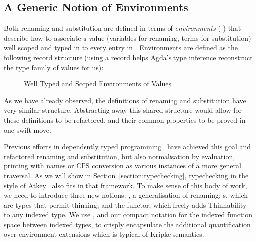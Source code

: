 \subsection{A Generic Notion of Environments}

Both renaming and substitution are defined in terms of \emph{environments}
{( )  } that describe how to associate a value 
(variables for renaming, terms for substitution) well scoped and typed in 
to every entry in . Environments are defined as the following record
structure (using a record helps Agda's type inference reconstruct the type family
 of values for us):

\begin{figure}[h]
\begin{center}
\end{center}
\caption{Well Typed and Scoped Environments of Values}\label{fig:environment}
\end{figure}

As we have already observed, the definitions of renaming and substitution have very
similar structure. Abstracting away this shared structure would allow for these
definitions to be refactored, and their common properties to be proved in one swift
move.

Previous efforts in dependently typed
programming~\cite{benton2012strongly,allais2017type}
have achieved this goal and refactored renaming and substitution,
but also normalisation by evaluation, printing with names or CPS conversion
as various instances of a more general traversal. As we will show in Section~\ref{section:typechecking},
typechecking in the style of Atkey~\citeyear{atkey2015algebraic} also
fits in that framework. To make sense of this body of work, we
need to introduce three new notions: , a generalisation of
renaming; s, which are types that permit thinning; and the
 functor, which freely adds Thinnability to any indexed type.
We use , and our compact notation for the indexed function space
between indexed types, to crisply encapsulate the additional quantification
over environment extensions which is typical of Kripke semantics.
\label{def:thinning}
\begin{center}
\end{center}

